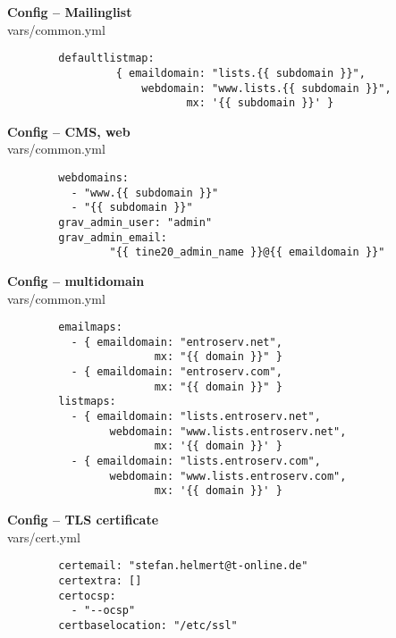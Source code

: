 \documentclass{beamer}
\begin{document}
\begin{frame}[fragile]{\insertsection}{\insertsubsection}
	\vspace{-0.5cm}
	\textbf{Config -- Mailinglist}\\
	vars/common.yml
	\begin{verbatim}
		defaultlistmap:
		         { emaildomain: "lists.{{ subdomain }}",
		             webdomain: "www.lists.{{ subdomain }}",
		                    mx: '{{ subdomain }}' }
	\end{verbatim}
\end{frame}	

\begin{frame}[fragile]{\insertsection}{\insertsubsection}
	\vspace{-0.5cm}
	\textbf{Config -- CMS, web}\\
	vars/common.yml
	\begin{verbatim}
		webdomains: 
		  - "www.{{ subdomain }}"
		  - "{{ subdomain }}"
		grav_admin_user: "admin"
		grav_admin_email:
		        "{{ tine20_admin_name }}@{{ emaildomain }}"
	\end{verbatim}
\end{frame}	

\begin{frame}[fragile]{\insertsection}{\insertsubsection}
	\vspace{-0.5cm}
	\textbf{Config -- multidomain}\\
	vars/common.yml
	\begin{verbatim}
		emailmaps:
		  - { emaildomain: "entroserv.net",
		               mx: "{{ domain }}" }
		  - { emaildomain: "entroserv.com",
		               mx: "{{ domain }}" }
		listmaps:
		  - { emaildomain: "lists.entroserv.net",
		        webdomain: "www.lists.entroserv.net",
		               mx: '{{ domain }}' }
		  - { emaildomain: "lists.entroserv.com",
		        webdomain: "www.lists.entroserv.com",
		               mx: '{{ domain }}' }
	\end{verbatim}
\end{frame}	

\begin{frame}[fragile]{\insertsection}{\insertsubsection}
	\vspace{-0.5cm}
	\textbf{Config -- TLS certificate}\\
	vars/cert.yml
	\begin{verbatim}
		certemail: "stefan.helmert@t-online.de"
		certextra: []
		certocsp:
		  - "--ocsp"
		certbaselocation: "/etc/ssl"
	\end{verbatim}
\end{frame}	
\end{document}
